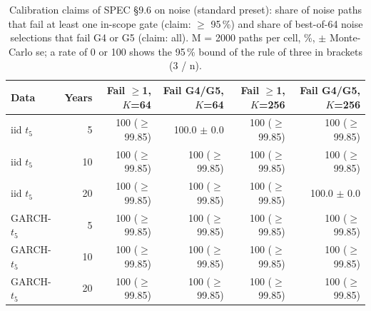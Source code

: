 \begin{table}[H]
\centering
\scriptsize
\caption{Calibration claims of SPEC \S 9.6 on noise (standard preset): share of noise paths that fail at least one in-scope gate (claim: $\ge$ 95\,\%) and share of best-of-64 noise selections that fail G4 or G5 (claim: all). M = 2000 paths per cell, \%, $\pm$ Monte-Carlo se; a rate of 0 or 100 shows the 95\,\% bound of the rule of three in brackets (3 / n).}
\label{tab:O5_calibration}
\begin{tabular}{lrrrrr}
\toprule
Data & Years & Fail $\ge$1, $K$=64 & Fail G4/G5, $K$=64 & Fail $\ge$1, $K$=256 & Fail G4/G5, $K$=256 \\
\midrule
iid $t_5$ & 5 & 100 ($\ge$ 99.85) & 100.0 $\pm$ 0.0 & 100 ($\ge$ 99.85) & 100 ($\ge$ 99.85) \\
iid $t_5$ & 10 & 100 ($\ge$ 99.85) & 100 ($\ge$ 99.85) & 100 ($\ge$ 99.85) & 100 ($\ge$ 99.85) \\
iid $t_5$ & 20 & 100 ($\ge$ 99.85) & 100 ($\ge$ 99.85) & 100 ($\ge$ 99.85) & 100.0 $\pm$ 0.0 \\
GARCH-$t_5$ & 5 & 100 ($\ge$ 99.85) & 100 ($\ge$ 99.85) & 100 ($\ge$ 99.85) & 100 ($\ge$ 99.85) \\
GARCH-$t_5$ & 10 & 100 ($\ge$ 99.85) & 100 ($\ge$ 99.85) & 100 ($\ge$ 99.85) & 100 ($\ge$ 99.85) \\
GARCH-$t_5$ & 20 & 100 ($\ge$ 99.85) & 100 ($\ge$ 99.85) & 100 ($\ge$ 99.85) & 100 ($\ge$ 99.85) \\
\bottomrule
\end{tabular}
\end{table}
